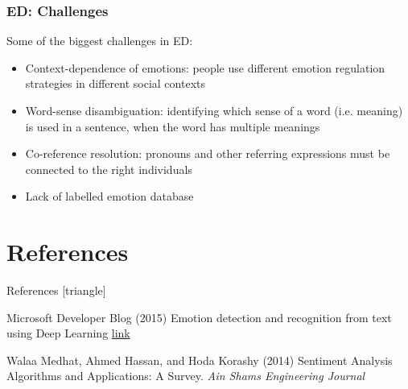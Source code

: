 \documentclass[xcolor=dvipsnames]{beamer}
\begin{document}
\begin{frame}
\frametitle{ED: Challenges}
Some of the biggest challenges in ED:
\begin{itemize}
\item Context-dependence of emotions: people use different emotion regulation strategies in different social contexts
\item Word-sense disambiguation: identifying which sense of a word (i.e. meaning) is used in a sentence, when the word has multiple meanings
\item Co-reference resolution: pronouns and other referring expressions must be connected to the right individuals
\item Lack of labelled emotion database
\end{itemize}
\end{frame}




\section{References}
\begin{frame}{References}
[triangle]
 \begin{thebibliography}{99} %
 Microsoft Developer Blog (2015)
\newblock Emotion detection and recognition from text using Deep Learning
\newblock \href{https://www.microsoft.com/developerblog/2015/11/29/emotion-detection-and-recognition-from-text-using-deep-learning/}{link}

 Walaa Medhat, Ahmed Hassan, and Hoda Korashy (2014)
\newblock Sentiment Analysis Algorithms and Applications: A Survey.
\newblock \emph{Ain Shams Engineering Journal}

\end{thebibliography}

\end{frame}
\end{document}
